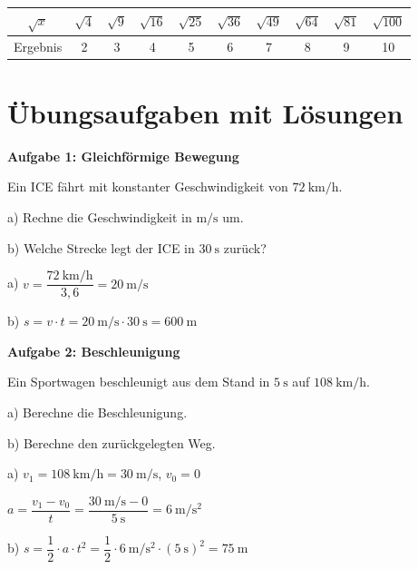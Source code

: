 \documentclass[11pt, a4paper]{article}
\begin{document}
\begin{center}
\begin{tabular}{|c|c|c|c|c|c|c|c|c|c|}
\hline
$\sqrt{x}$ & $\sqrt{4}$ & $\sqrt{9}$ & $\sqrt{16}$ & $\sqrt{25}$ & $\sqrt{36}$ & $\sqrt{49}$ & $\sqrt{64}$ & $\sqrt{81}$ & $\sqrt{100}$ \\
\hline
Ergebnis & 2 & 3 & 4 & 5 & 6 & 7 & 8 & 9 & 10 \\
\hline
\end{tabular}
\end{center}

\newpage


\section{Übungsaufgaben mit Lösungen}

\textbf{Aufgabe 1: Gleichförmige Bewegung}

Ein ICE fährt mit konstanter Geschwindigkeit von $\SI{72}{\kilo\metre\per\hour}$.

a) Rechne die Geschwindigkeit in $\si{\metre\per\second}$ um.

b) Welche Strecke legt der ICE in $\SI{30}{\second}$ zurück?

\begin{tcolorbox}[colback=hellgrau, colframe=grau, boxrule=0.5pt, title=Lösung]
a) $v = \dfrac{\SI{72}{\kilo\metre\per\hour}}{3{,}6} = \SI{20}{\metre\per\second}$

b) $s = v \cdot t = \SI{20}{\metre\per\second} \cdot \SI{30}{\second} = \SI{600}{\metre}$
\end{tcolorbox}

\vspace{0.5em}

\textbf{Aufgabe 2: Beschleunigung}

Ein Sportwagen beschleunigt aus dem Stand in $\SI{5}{\second}$ auf $\SI{108}{\kilo\metre\per\hour}$.

a) Berechne die Beschleunigung.

b) Berechne den zurückgelegten Weg.

\begin{tcolorbox}[colback=hellgrau, colframe=grau, boxrule=0.5pt, title=Lösung]
a) $v_1 = \SI{108}{\kilo\metre\per\hour} = \SI{30}{\metre\per\second}$, \quad $v_0 = 0$

$a = \dfrac{v_1 - v_0}{t} = \dfrac{\SI{30}{\metre\per\second} - 0}{\SI{5}{\second}} = \SI{6}{\metre\per\second\squared}$

b) $s = \dfrac{1}{2} \cdot a \cdot t^2 = \dfrac{1}{2} \cdot \SI{6}{\metre\per\second\squared} \cdot (\SI{5}{\second})^2 = \SI{75}{\metre}$
\end{tcolorbox}
\end{document}
